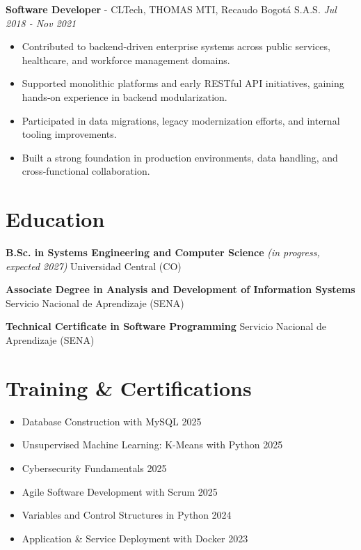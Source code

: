 \documentclass[9pt,letterpaper]{extarticle}
\begin{document}
	\textbf{Software Developer} - {CLTech, THOMAS MTI, Recaudo Bogotá S.A.S.}
	\hfill \textit{Jul 2018 - Nov 2021}
	\begin{itemize}
		\item Contributed to backend‑driven enterprise systems across public services, healthcare, and workforce management domains.
		\item Supported monolithic platforms and early RESTful API initiatives, gaining hands‑on experience in backend modularization.
		\item Participated in data migrations, legacy modernization efforts, and internal tooling improvements.
		\item Built a strong foundation in production environments, data handling, and cross‑functional collaboration.
	\end{itemize}
	
	\section*{Education}
	
	\textbf{B.Sc. in Systems Engineering and Computer Science} \textit{(in progress, expected 2027)} \hfill {Universidad Central (CO)}
	
	\textbf{Associate Degree in Analysis and Development of Information Systems} \hfill {Servicio Nacional de Aprendizaje (SENA)}

	\textbf{Technical Certificate in Software Programming} \hfill {Servicio Nacional de Aprendizaje (SENA)}
	
	\section*{Training \& Certifications}
	\begin{itemize}
		\item Database Construction with MySQL \hfill 2025
		\item Unsupervised Machine Learning: K-Means with Python \hfill 2025
		\item Cybersecurity Fundamentals \hfill 2025
		\item Agile Software Development with Scrum \hfill 2025
		\item Variables and Control Structures in Python \hfill 2024
		\item Application \& Service Deployment with Docker \hfill 2023
	\end{itemize}
\end{document}
